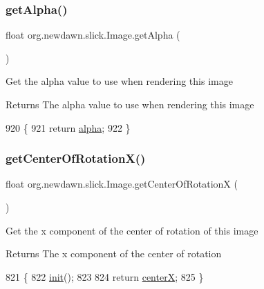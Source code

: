 \subsubsection{\texorpdfstring{get\+Alpha()}{getAlpha()}}
{\footnotesize\ttfamily float org.\+newdawn.\+slick.\+Image.\+get\+Alpha (\begin{DoxyParamCaption}{ }\end{DoxyParamCaption})\hspace{0.3cm}{\ttfamily [inline]}}

Get the alpha value to use when rendering this image

\begin{DoxyReturn}{Returns}
The alpha value to use when rendering this image 
\end{DoxyReturn}

\begin{DoxyCode}
920                             \{
921         \textcolor{keywordflow}{return} \mbox{\hyperlink{classorg_1_1newdawn_1_1slick_1_1_image_a10f6c66f0f6ed78b3c1c05ac4f076dda}{alpha}};
922     \}
\end{DoxyCode}
\mbox{\label{classorg_1_1newdawn_1_1slick_1_1_image_a34deedb3a506d7a507e6cc276b5b61d9}} 
\subsubsection{\texorpdfstring{get\+Center\+Of\+Rotation\+X()}{getCenterOfRotationX()}}
{\footnotesize\ttfamily float org.\+newdawn.\+slick.\+Image.\+get\+Center\+Of\+RotationX (\begin{DoxyParamCaption}{ }\end{DoxyParamCaption})\hspace{0.3cm}{\ttfamily [inline]}}

Get the x component of the center of rotation of this image

\begin{DoxyReturn}{Returns}
The x component of the center of rotation 
\end{DoxyReturn}

\begin{DoxyCode}
821                                         \{
822         \mbox{\hyperlink{classorg_1_1newdawn_1_1slick_1_1_image_a94d180c9218ba1444a0496a1898ec345}{init}}();
823         
824         \textcolor{keywordflow}{return} \mbox{\hyperlink{classorg_1_1newdawn_1_1slick_1_1_image_aef548becf8450e7173bbd8bded5b6b48}{centerX}};
825     \}
\end{DoxyCode}
\mbox{\label{classorg_1_1newdawn_1_1slick_1_1_image_a198b4dd75a34f47c24b42930d952751a}} 

